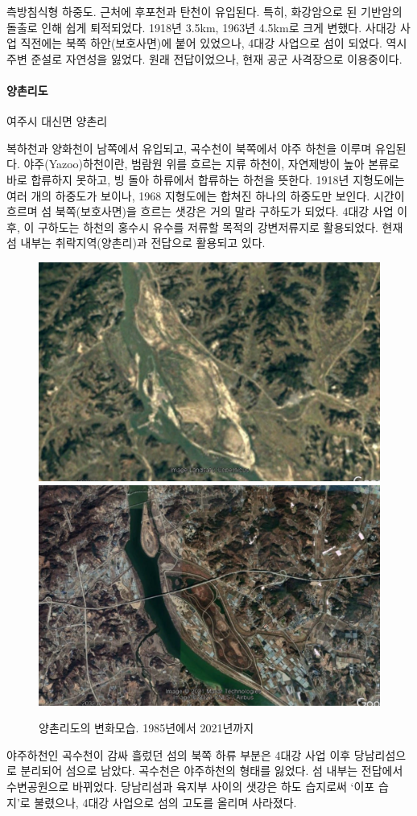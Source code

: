 측방침식형 하중도. 근처에 후포천과 탄천이 유입된다. 특히, 화강암으로 된 기반암의 돌출로 인해 쉽게 퇴적되었다.
1918년 3.5km, 1963년 4.5km로 크게 변했다. 사대강 사업 직전에는 북쪽 하안(보호사면)에 붙어 있었으나, 4대강 사업으로 섬이 되었다.
역시 주변 준설로 자연성을 잃었다.
원래 전답이었으나, 현재 공군 사격장으로 이용중이다.


\paragraph{양촌리도}
여주시 대신면 양촌리

복하천과 양화천이 남쪽에서 유입되고, 곡수천이 북쪽에서 야주 하천을 이루며 유입된다.
야주(Yazoo)하천이란, 범람원 위를 흐르는 지류 하천이, 자연제방이 높아 본류로 바로 합류하지 못하고, 빙 돌아 하류에서 합류하는 하천을 뜻한다.
1918년 지형도에는 여러 개의 하중도가 보이나, 1968 지형도에는 합쳐진 하나의 하중도만 보인다. 
시간이 흐르며 섬 북쪽(보호사면)을 흐르는 샛강은 거의 말라 구하도가 되었다.
4대강 사업 이후, 이 구하도는 하천의 홍수시 유수를 저류할 목적의 강변저류지로 활용되었다. 
현재 섬 내부는 취락지역(양촌리)과 전답으로 활용되고 있다. 


\begin{figure}[ht]
    \centering
    \includegraphics[width=.45\textwidth]{img/양촌리 1985.jpg}
    \includegraphics[width=.45\textwidth]{img/양촌리 2021.jpg}
    \caption{양촌리도의 변화모습. 1985년에서 2021년까지 }
    \label{fig:my_labe613}
\end{figure}


야주하천인 곡수천이 감싸 흘렀던 섬의 북쪽 하류 부분은 4대강 사업 이후 당남리섬으로 분리되어 섬으로 남았다. 
곡수천은 야주하천의 형태를 잃었다. 섬 내부는 전답에서 수변공원으로 바뀌었다.
당남리섬과 육지부 사이의 샛강은 하도 습지로써 `이포 습지'로 불렸으나, 4대강 사업으로 섬의 고도를 올리며 사라졌다.

